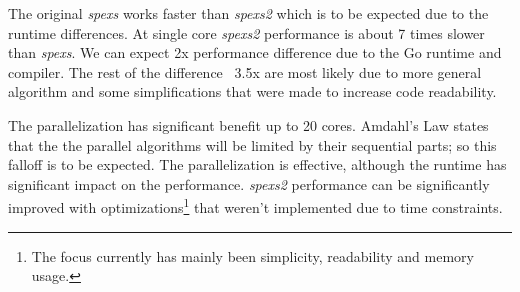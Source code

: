 The original \emph{spexs} works faster than \emph{spexs2} which is to be expected due to the runtime differences. At single core \emph{spexs2} performance is about 7 times slower than \emph{spexs}. We can expect 2x performance difference due to the Go runtime and compiler. The rest of the difference ~3.5x are most likely due to more general algorithm and some simplifications that were made to increase code readability.

The parallelization has significant benefit up to 20 cores. Amdahl's Law \cite{AmdahlsReval} states that the the parallel algorithms will be limited by their sequential parts; so this falloff is to be expected. The parallelization is effective, although the runtime has significant impact on the performance. \emph{spexs2} performance can be significantly improved with optimizations\footnote{The focus currently has mainly been simplicity, readability and memory usage.} that weren't implemented due to time constraints.